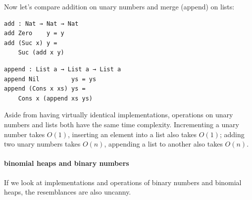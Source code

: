 \documentclass[\main/thesis.tex]{subfiles}
\begin{document}
Now let's compare addition on unary numbers and merge (append) on lists:

\noindent\begin{minipage}{.45\textwidth}
\begin{lstlisting}[basicstyle=\ttfamily\scriptsize]
add : Nat → Nat → Nat
add Zero    y = y
add (Suc x) y =
    Suc (add x y)
\end{lstlisting}
\end{minipage}\hfill
\begin{minipage}{.48\textwidth}
\begin{lstlisting}[basicstyle=\ttfamily\scriptsize]
append : List a → List a → List a
append Nil         ys = ys
append (Cons x xs) ys =
    Cons x (append xs ys)
\end{lstlisting}
\end{minipage}

Aside from having virtually identical implementations, operations on unary numbers
and lists both have the same time complexity. Incrementing a unary number takes
$ O(1) $, inserting an element into a list also takes $ O(1) $; adding two unary
numbers takes $ O(n) $, appending a list to another also takes $ O(n) $.

\paragraph{binomial heaps and binary numbers}

If we look at implementations and operations of binary numbers and binomial
heaps, the resemblances are also uncanny.

\begin{center}
\end{center}
\end{document}
